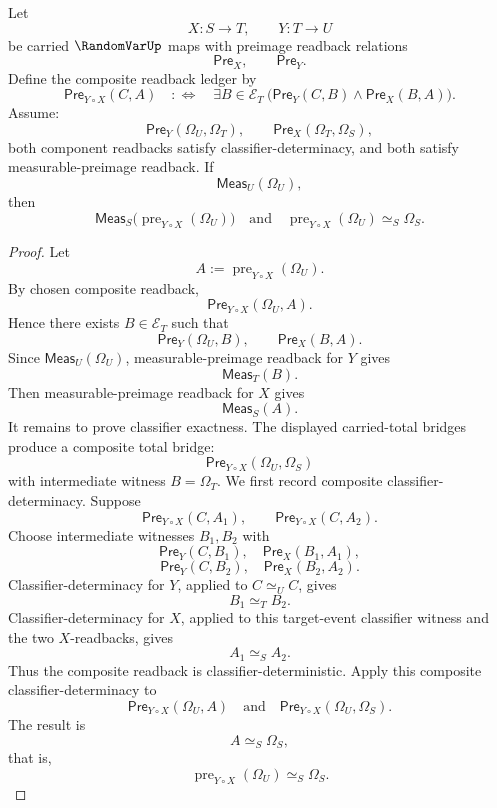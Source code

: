 \begin{theorem}
\label{thm:randomvar-composition-preserves-total-event-preimage-exactness}
Let
$$
X:S\to T,
\qquad
Y:T\to U
$$
be carried $\RandomVarUp$ maps with preimage readback relations
$$
\mathsf{Pre}_X,
\qquad
\mathsf{Pre}_Y.
$$
Define the composite readback ledger by
$$
\mathsf{Pre}_{Y\circ X}(C,A)
\quad:\Longleftrightarrow\quad
\exists B\in\mathcal E_T\
\bigl(\mathsf{Pre}_Y(C,B)\wedge \mathsf{Pre}_X(B,A)\bigr).
$$
Assume:
$$
\mathsf{Pre}_Y(\Omega_U,\Omega_T),
\qquad
\mathsf{Pre}_X(\Omega_T,\Omega_S),
$$
both component readbacks satisfy classifier-determinacy, and both satisfy measurable-preimage readback. If
$$
\mathsf{Meas}_U(\Omega_U),
$$
then
$$
\mathsf{Meas}_S\bigl(\operatorname{pre}_{Y\circ X}(\Omega_U)\bigr)
\quad\text{and}\quad
\operatorname{pre}_{Y\circ X}(\Omega_U)\simeq_S\Omega_S.
$$
\end{theorem}
\begin{proof}
Let
$$
A:=\operatorname{pre}_{Y\circ X}(\Omega_U).
$$
By chosen composite readback,
$$
\mathsf{Pre}_{Y\circ X}(\Omega_U,A).
$$
Hence there exists $B\in\mathcal E_T$ such that
$$
\mathsf{Pre}_Y(\Omega_U,B),
\qquad
\mathsf{Pre}_X(B,A).
$$
Since $\mathsf{Meas}_U(\Omega_U)$, measurable-preimage readback for $Y$ gives
$$
\mathsf{Meas}_T(B).
$$
Then measurable-preimage readback for $X$ gives
$$
\mathsf{Meas}_S(A).
$$
It remains to prove classifier exactness. The displayed carried-total bridges produce a composite total bridge:
$$
\mathsf{Pre}_{Y\circ X}(\Omega_U,\Omega_S)
$$
with intermediate witness $B=\Omega_T$.
We first record composite classifier-determinacy. Suppose
$$
\mathsf{Pre}_{Y\circ X}(C,A_1),
\qquad
\mathsf{Pre}_{Y\circ X}(C,A_2).
$$
Choose intermediate witnesses $B_1,B_2$ with
$$
\mathsf{Pre}_Y(C,B_1),\quad \mathsf{Pre}_X(B_1,A_1),
$$
$$
\mathsf{Pre}_Y(C,B_2),\quad \mathsf{Pre}_X(B_2,A_2).
$$
Classifier-determinacy for $Y$, applied to $C\simeq_U C$, gives
$$
B_1\simeq_T B_2.
$$
Classifier-determinacy for $X$, applied to this target-event classifier witness and the two $X$-readbacks, gives
$$
A_1\simeq_S A_2.
$$
Thus the composite readback is classifier-deterministic.
Apply this composite classifier-determinacy to
$$
\mathsf{Pre}_{Y\circ X}(\Omega_U,A)
\quad\text{and}\quad
\mathsf{Pre}_{Y\circ X}(\Omega_U,\Omega_S).
$$
The result is
$$
A\simeq_S\Omega_S,
$$
that is,
$$
\operatorname{pre}_{Y\circ X}(\Omega_U)\simeq_S\Omega_S.
$$
\end{proof}

